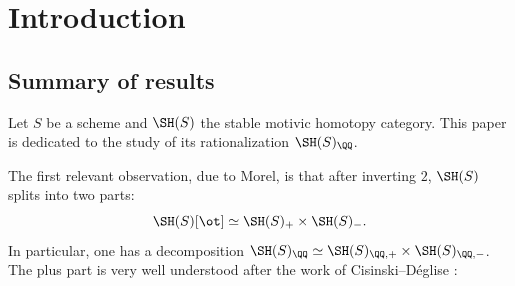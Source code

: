 \section{Introduction}

\subsection*{Summary of results}

Let $S$ be a scheme and $\SH(S)$ the stable motivic homotopy category.
This paper is dedicated to the study of its rationalization $\SH(S)_\QQ$.

The first relevant observation, due to Morel, is that after inverting $2$, $\SH(S)$ splits into two parts:
\[
\SH(S)[\ot] \simeq \SH(S)_+ \times \SH(S)_-.
\]
In particular, one has a decomposition $\SH(S)_\QQ \simeq \SH(S)_{\QQ,+}\times \SH(S)_{\QQ,-}$.
The plus part is very well understood after the work of Cisinski--Déglise \cite{CD3}:

